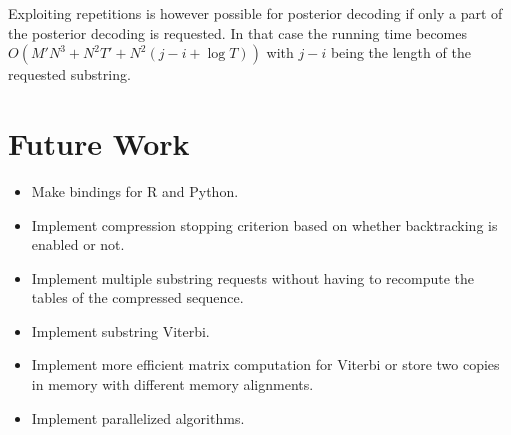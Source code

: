 Exploiting repetitions is however possible for posterior decoding if only a
part of the posterior decoding is requested. In that case the running time
becomes $O(M' N^3 + N^2 T' + N^2 (j - i + \log T))$ with $j - i$ being the
length of the requested substring.

\section{Future Work}

\begin{itemize}
\item Make bindings for R and Python.
\item Implement compression stopping criterion based on whether backtracking is
  enabled or not.
\item Implement multiple substring requests without having to recompute the
  tables of the compressed sequence.
\item Implement substring Viterbi.
\item Implement more efficient matrix computation for Viterbi or store two
  copies in memory with different memory alignments.
\item Implement parallelized algorithms.
\end{itemize}


